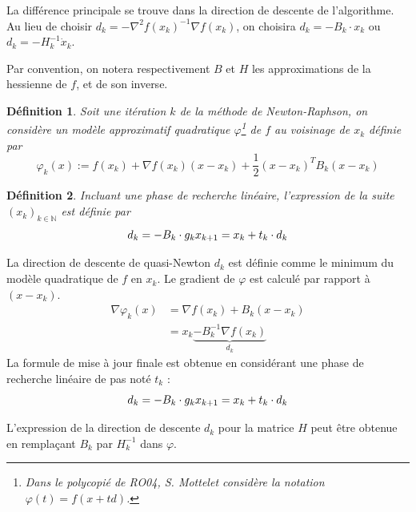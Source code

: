\documentclass[3p, twocolumn]{elsarticle}
\newtheorem{definition}{Définition}[section]
\begin{document}
La différence principale se trouve dans la direction de descente de l'algorithme. Au lieu de choisir $d_{k} = -\nabla ^{2}f(x_{k})^{-1} \nabla f(x_{k})$, on choisira $d_k = -B_k\cdot x_k$ ou $d_k = -H_k^{-1}\dot x_k$. 

Par convention, on notera respectivement $B$ et $H$ les approximations de la hessienne de $f$, et de son inverse.

\begin{definition}
    Soit une itération $k$ de la méthode de Newton-Raphson, on considère un modèle approximatif quadratique $\varphi$\footnote{Dans le polycopié de RO04, S. Mottelet \cite{poly:mottelet2003} considère la notation $\varphi(t) = f(x+td)$.} de $f$ au voisinage de $x_{k}$ définie par
    \begin{equation}
        \varphi_k(x) := f(x_k) + \nabla f(x_k) (x - x_k) + \frac12 (x-x_k)^T B_k (x-x_k)
    \end{equation}
\end{definition}

\begin{definition}
    Incluant une phase de recherche linéaire, l'expression de la suite $(x_k)_{k\in \mathbb{N}}$ est définie par 
    \begin{equation}
        d_k = -B_k\cdot g_k \\
        x_{k+1} = x_k + t_k\cdot d_k
    \end{equation}
\end{definition}

\begin{pf}
    La direction de descente de quasi-Newton $d_k$ est définie comme le minimum du modèle quadratique de $f$ en $x_k$. Le gradient de $\varphi$ est calculé par rapport à $(x - x_k)$. 
    \begin{align*}
        \nabla \varphi_k(x)&=\nabla f(x_k) + B_k(x-x_k)\\
        &= x_k \underbrace{- B_k^{-1}\nabla f(x_k)}_{d_k} 
    \end{align*}
    La formule de mise à jour finale est obtenue en considérant une phase de recherche linéaire de pas noté $t_k$ :
    \begin{equation}
        d_k = -B_k\cdot g_k \\
        x_{k+1} = x_k + t_k\cdot d_k
    \end{equation}
\end{pf}

\begin{rmk}
    L'expression de la direction de descente $d_k$ pour la matrice $H$ peut être obtenue en remplaçant $B_k$ par $H_k^{-1}$ dans $\varphi$.
\end{rmk}
\end{document}
